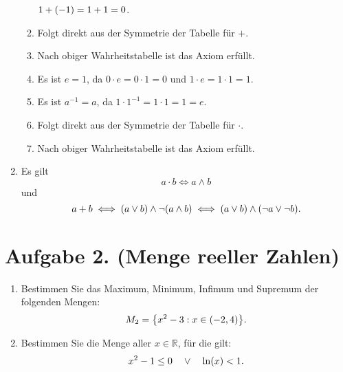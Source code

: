 \documentclass[german,12pt]{homework}
\newcommand{\RR}{\mathbb{R}}
\DeclarePairedDelimiter{\enbrace}{(}{)}
\DeclarePairedDelimiter{\penbrace}{\{}{\}}
\begin{document}
\begin{enumerate}
\begin{enumerate}[label=(A\arabic*)]
            \(1 + \enbrace*{-1} = 1 + 1 = 0\).
            \item Folgt direkt aus der Symmetrie der Tabelle für \(+\).
            \item Nach obiger Wahrheitstabelle ist das Axiom erfüllt.
            \item Es ist \(e = 1\), da \(0 \cdot e = 0 \cdot 1 = 0\) und \(1
            \cdot e = 1 \cdot 1 = 1\).
            \item Es ist \(a^{-1} = a\), da \(1 \cdot 1^{-1} = 1 \cdot 1 = 1 =
            e\).
            \item Folgt direkt aus der Symmetrie der Tabelle für \(\cdot\).
            \item Nach obiger Wahrheitstabelle ist das Axiom erfüllt.
        \end{enumerate}
        \item Es gilt
        \[a \cdot b \iff a \land b\]
        und
        \[a + b \iff \enbrace*{a \lor b} \land \lnot\enbrace*{a \land b} \iff
        \enbrace*{a \lor b} \land \enbrace*{\lnot{a} \lor \lnot{b}}.\]
    \end{enumerate}

    \section*{Aufgabe 2. (Menge reeller Zahlen)}

    \begin{problem}
        \begin{enumerate}
            \item Bestimmen Sie das Maximum, Minimum, Infimum und Supremum der
            folgenden Mengen:
            \[M_2 = \penbrace*{x^2 - 3 : x \in \enbrace*{-2, 4}}.\]
            \item Bestimmen Sie die Menge aller \(x \in \RR\), für die gilt:
            \[x^2 - 1 \le 0 \quad \lor \quad \ln\enbrace*{x} < 1.\]
        \end{enumerate}
    \end{problem}
\end{document}
